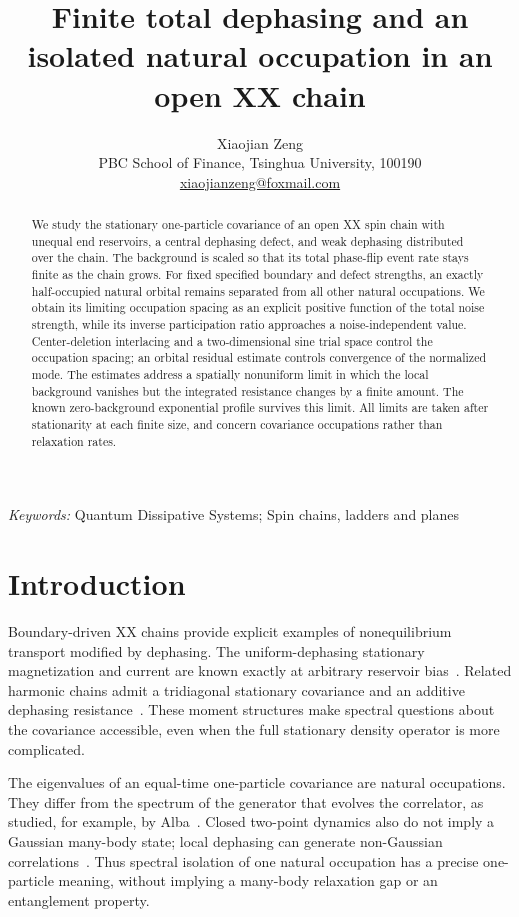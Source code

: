 \documentclass[11pt,a4paper]{article}
\title{Finite total dephasing and an isolated natural occupation in an open XX chain}
\author{Xiaojian Zeng\\[3pt]
\small PBC School of Finance, Tsinghua University, 100190\\
\small \href{mailto:xiaojianzeng@foxmail.com}{xiaojianzeng@foxmail.com}}
\date{}
\begin{document}
\maketitle
\begin{abstract}
We study the stationary one-particle covariance of an open XX spin chain
with unequal end reservoirs, a central dephasing defect, and weak
dephasing distributed over the chain. The background is scaled so that
its total phase-flip event rate stays finite as the chain grows. For
fixed specified boundary and defect strengths, an exactly half-occupied
natural orbital remains separated from all other natural occupations.
We obtain its limiting occupation spacing as an explicit positive
function of the total noise strength, while its inverse participation
ratio approaches a noise-independent value. Center-deletion interlacing
and a two-dimensional sine trial space control the occupation spacing;
an orbital residual estimate controls convergence of the normalized
mode. The estimates address a spatially nonuniform limit in which the
local background vanishes but the integrated resistance changes by a
finite amount. The known zero-background exponential profile survives
this limit. All limits are taken after stationarity at each finite size,
and concern covariance occupations rather than relaxation rates.
\end{abstract}
\noindent\textit{Keywords:} Quantum Dissipative Systems;
Spin chains, ladders and planes

\section{Introduction}
Boundary-driven XX chains provide explicit examples of nonequilibrium
transport modified by dephasing. The uniform-dephasing stationary
magnetization and current are known exactly at arbitrary reservoir
bias~\cite{Znidaric2010}. Related harmonic chains admit a tridiagonal
stationary covariance and an additive dephasing resistance~\cite{Asadian2013}.
These moment structures make spectral questions about the covariance
accessible, even when the full stationary density operator is more
complicated.

The eigenvalues of an equal-time one-particle covariance are natural
occupations. They differ from the spectrum of the generator that evolves
the correlator, as studied, for example, by Alba~\cite{Alba2025}.
Closed two-point dynamics also do not imply a Gaussian many-body state;
local dephasing can generate non-Gaussian correlations~\cite{Dolgirev2020}.
Thus spectral isolation of one natural occupation has a precise
one-particle meaning, without implying a many-body relaxation gap or an
entanglement property.
\end{document}
